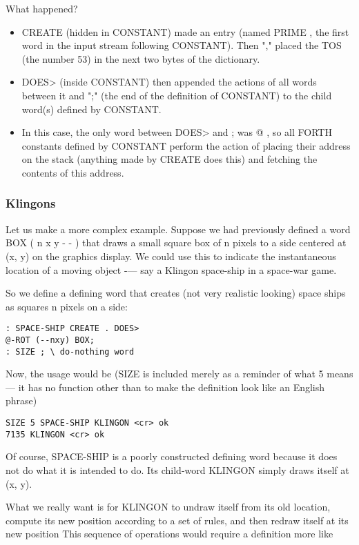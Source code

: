 What happened?
\begin{itemize}
    \item CREATE (hidden in CONSTANT) made an entry (named PRIME , the first word in the input stream following CONSTANT). Then "," placed the TOS (the number 53) in the next two bytes of the dictionary.
    \item DOES> (inside CONSTANT) then appended the actions of all words between it and ";" (the end of the definition of CONSTANT) to the child word(s) defined by CONSTANT.
    \item In this case, the only word between DOES> and ; was @ , so all FORTH constants defined by CONSTANT perform the action of placing their address on the stack (anything made by CREATE does this) and fetching the contents of this address.
\end{itemize}

\subsubsection{Klingons}
Let us make a more complex example. Suppose we had previously defined a word BOX ( n x y - - ) that draws a small square box of n pixels to a side centered at (x, y) on the graphics display. We could use this to indicate the instantaneous location of a moving object -— say a Klingon space-ship in a space-war game.

So we define a defining word that creates (not very realistic looking) space ships as squares n pixels on a side:

\begin{lstlisting}
: SPACE-SHIP CREATE . DOES>
@-ROT (--nxy) BOX;
: SIZE ; \ do-nothing word
\end{lstlisting}

Now, the usage would be (SIZE is included merely as a reminder of what 5 means — it has no function other than to make the definition look like an English phrase)

\begin{lstlisting}
SIZE 5 SPACE-SHIP KLINGON <cr> ok
7135 KLINGON <cr> ok
\end{lstlisting}

Of course, SPACE-SHIP is a poorly constructed defining word because it does not do what it is intended to do. Its child-word KLINGON simply draws itself at (x, y).

What we really want is for KLINGON to undraw itself from its old location, compute its new position according to a set of rules, and then redraw itself at its new position This sequence of operations would require a definition more like

